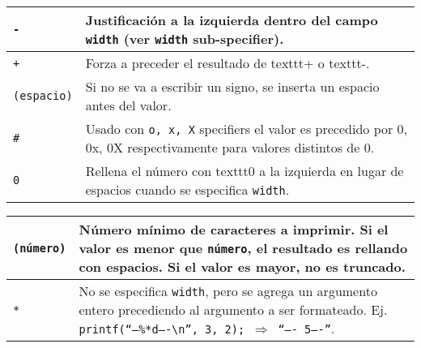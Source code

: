 \begin{center}
\tabletail{\hline}
\tablelasttail{\hline}
\footnotesize
{
\begin{xtabular}{|C{.2\columnwidth}|L{.8\columnwidth}|}
\texttt{-}         & Justificaci\'on a la izquierda dentro del campo \texttt{width} (ver \texttt{width} sub-specifier).                        \\ \hline                                                                          
\texttt{+}         & Forza a preceder el resultado de texttt{+} o texttt{-}.                                                                   \\ \hline                               
\texttt{(espacio)} & Si no se va a escribir un signo, se inserta un espacio antes del valor.                                                   \\ \hline                                               
\texttt{\#}         & Usado con  \texttt{o, x, X} specifiers el valor es precedido por {0, 0x, 0X} respectivamente para valores distintos de 0. \\ \hline                                                                                                 
\texttt{0}         & Rellena el n\'umero con texttt{0} a la izquierda en lugar de espacios cuando se especifica \texttt{width}.                \\                                                                                   
\end{xtabular}
}

\vspace{0.2cm}

\tabletail{\hline}
\tablelasttail{\hline}
\footnotesize
{
\begin{xtabular}{|C{.2\columnwidth}|L{.8\columnwidth}|}
\texttt{(n\'umero)} & N\'umero m\'inimo de caracteres a imprimir. Si el valor es menor que \texttt{n\'umero}, el resultado es rellando con espacios. Si el valor es mayor, no es truncado.                      \\ \hline
\texttt{*}          & No se especifica \texttt{width}, pero se agrega un argumento entero precediendo al argumento a ser formateado. Ej. \texttt{printf(\textrm{``}---\%*d----\textbackslash n\textrm{''}, 3, 2); $\Rightarrow$ \textrm{``}----  5----\textrm{''}}.   \\ 
\end{xtabular}
}


\end{center}
